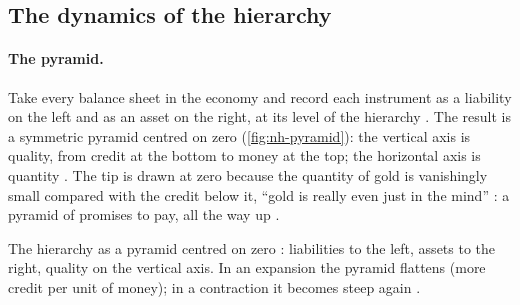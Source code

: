 \begin{paracol}{2}
\section{The dynamics of the hierarchy}\label{sec:nh-dynamics}

\paragraph{The pyramid.} Take every balance sheet in the economy and record each instrument as a liability on the left
and as an asset on the right, at its level of the hierarchy . The result is a symmetric
pyramid centred on zero (\cref{fig:nh-pyramid}): the vertical axis is quality, from credit at the bottom to money at
the top; the horizontal axis is quantity . The tip is drawn at zero because the quantity of gold is
vanishingly small compared with the credit below it, ``gold is really even just in the mind'' : a
pyramid of promises to pay, all the way up .

\begin{nfigure}
\caption{The hierarchy as a pyramid centred on zero : liabilities to the left, assets to the right, quality on
the vertical axis. In an expansion the pyramid flattens (more credit per unit of money); in a contraction it becomes
steep again .}\label{fig:nh-pyramid}
\end{nfigure}


\end{paracol}
